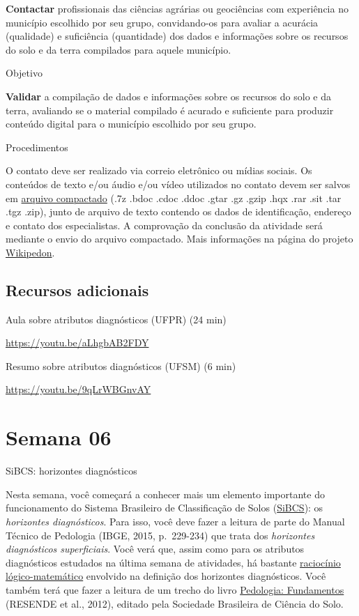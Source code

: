 \documentclass[
  11pt,
  a4paper,
  dvipsnames]{tufte-book}
\begin{document}
\textbf{Contactar} profissionais das ciências agrárias ou geociências com experiência no município escolhido por seu grupo, convidando-os para avaliar a acurácia (qualidade) e suficiência (quantidade) dos dados e informações sobre os recursos do solo e da terra compilados para aquele município.

Objetivo

\textbf{Validar} a compilação de dados e informações sobre os recursos do solo e da terra, avaliando se o material compilado é acurado e suficiente para produzir conteúdo digital para o município escolhido por seu grupo.

Procedimentos

O contato deve ser realizado via correio eletrônico ou mídias sociais. Os conteúdos de texto e/ou áudio e/ou vídeo utilizados no contato devem ser salvos em \href{https://pt.wikipedia.org/wiki/Compactador_de_arquivos}{arquivo compactado} (.7z .bdoc .cdoc .ddoc .gtar .gz .gzip .hqx .rar .sit .tar .tgz .zip), junto de arquivo de texto contendo os dados de identificação, endereço e contato dos especialistas. A comprovação da conclusão da atividade será mediante o envio do arquivo compactado. Mais informações na página do projeto \href{https://pt.wikiversity.org/wiki/Wikipedon}{Wikipedon}.

\hypertarget{recursos-adicionais-1}{%
\section{Recursos adicionais}\label{recursos-adicionais-1}}

Aula sobre atributos diagnósticos (UFPR) (24 min)

\url{https://youtu.be/aLhgbAB2FDY}

Resumo sobre atributos diagnósticos (UFSM) (6 min)

\url{https://youtu.be/9qLrWBGnvAY}

\hypertarget{semana-06}{%
\chapter{Semana 06}\label{semana-06}}

SiBCS: horizontes diagnósticos

Nesta semana, você começará a conhecer mais um elemento importante do funcionamento do Sistema Brasileiro de Classificação de Solos (\href{https://www.embrapa.br/en/solos/sibcs}{SiBCS}): os \emph{horizontes diagnósticos}. Para isso, você deve fazer a leitura de parte do Manual Técnico de Pedologia (IBGE, 2015, p.~229-234) que trata dos \emph{horizontes diagnósticos superficiais}. Você verá que, assim como para os atributos diagnósticos estudados na última semana de atividades, há bastante \href{https://pt.wikipedia.org/wiki/Racioc\%C3\%ADnio_l\%C3\%B3gico-matem\%C3\%A1tico}{raciocínio lógico-matemático} envolvido na definição dos horizontes diagnósticos. Você também terá que fazer a leitura de um trecho do livro \href{https://www.sbcs.org.br/loja/index.php?route=product/product\&product_id=57}{Pedologia: Fundamentos} (RESENDE et al., 2012), editado pela Sociedade Brasileira de Ciência do Solo.
\end{document}
